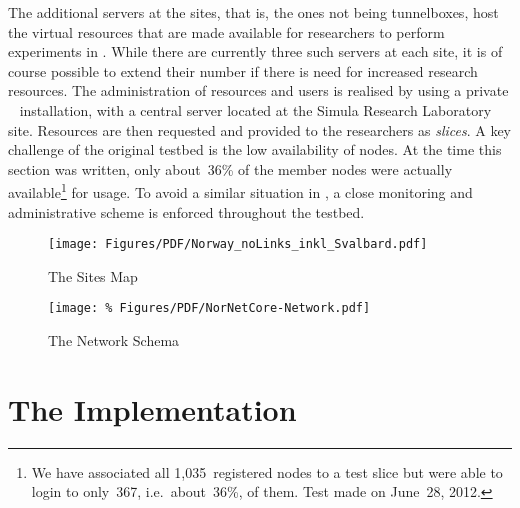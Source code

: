The additional servers at the sites, that is, the ones not being tunnelboxes, host the virtual resources that are made available for researchers to perform experiments in . While there are currently three such servers at each site, it is of course possible to extend their number if there is need for increased research resources. The administration of resources and users is realised by using a private ~\cite{PBF+05} installation, with a central server located at the Simula Research Laboratory~\cite{SimulaBook} site. Resources are then requested and provided to the researchers as \emph{slices}. A key challenge of the original  testbed is the low availability of nodes. At the time this section was written, only about~36\% of the  member nodes were actually available\footnote{We have associated all 1,035~registered nodes to a test slice but were able to login to only~367, i.e.\ about~36\%, of them. Test made on June~28, 2012.} for usage. To avoid a similar situation in , a close monitoring and administrative scheme is enforced throughout the testbed. 

\begin{figure}
\begin{center}
\texttt{[image: Figures/PDF/Norway\_noLinks\_inkl\_Svalbard.pdf]}
\end{center}
\caption{The  Sites Map}
\label{cap:NorNet-Sites-Map}
\end{figure}

\begin{figure}
\begin{center}
\texttt{[image: \%
   Figures/PDF/NorNetCore-Network.pdf]}  
\end{center}
\caption{The  Network Schema}
\label{cap:NorNet-Network}
\end{figure}



\section{The Implementation}
\label{sec:Implementation}

